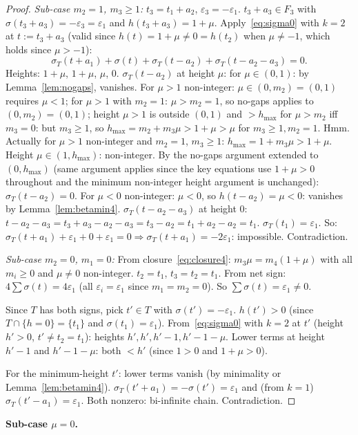 \documentclass{article}
\begin{document}
\begin{proof}
\textit{Sub-case $m_2=1$, $m_3\ge 1$:}
$t_3=t_1+a_2$, $\varepsilon_3=-\varepsilon_1$.  $t_3+a_3\in F_3$ with
$\sigma(t_3+a_3)=-\varepsilon_3=\varepsilon_1$ and $h(t_3+a_3)=1+\mu$.
Apply~\eqref{eq:sigma0} with $k=2$ at $t:=t_3+a_3$ (valid since $h(t)=1+\mu\ne 0=h(t_2)$
when $\mu\ne -1$, which holds since $\mu>-1$):
\[
  \sigma_T(t+a_1)+\sigma(t)+\sigma_T(t-a_2)+\sigma_T(t-a_2-a_3)=0.
\]
Heights: $1+\mu$, $1+\mu$, $\mu$, $0$.
$\sigma_T(t-a_2)$ at height $\mu$:
for $\mu\in(0,1)$: by Lemma~\ref{lem:nogaps}, vanishes.
For $\mu>1$ non-integer: $\mu\in(0,m_2)=(0,1)$ requires $\mu<1$; for $\mu>1$ with $m_2=1$: $\mu>m_2=1$, so no-gaps applies to $(0,m_2)=(0,1)$; height $\mu>1$ is outside $(0,1)$ and $>h_{\max}$ for $\mu>m_2$ iff $m_3=0$: but $m_3\ge 1$, so $h_{\max}=m_2+m_3\mu>1+\mu>\mu$ for $m_3\ge 1, m_2=1$. Hmm.
Actually for $\mu>1$ non-integer and $m_2=1$, $m_3\ge 1$: $h_{\max}=1+m_3\mu>1+\mu$.
Height $\mu\in(1,h_{\max})$: non-integer. By the no-gaps argument extended to $(0,h_{\max})$ (same argument applies since the key equations use $1+\mu>0$ throughout and the minimum non-integer height argument is unchanged): $\sigma_T(t-a_2)=0$.
For $\mu<0$ non-integer: $\mu<0$, so $h(t-a_2)=\mu<0$: vanishes by Lemma~\ref{lem:betamin4}.
$\sigma_T(t-a_2-a_3)$ at height $0$: $t-a_2-a_3=t_3+a_3-a_2-a_3=t_3-a_2=t_1+a_2-a_2=t_1$.
$\sigma_T(t_1)=\varepsilon_1$.
So: $\sigma_T(t+a_1)+\varepsilon_1+0+\varepsilon_1=0 \Rightarrow \sigma_T(t+a_1)=-2\varepsilon_1$: impossible. Contradiction.

\textit{Sub-case $m_2=0$, $m_1=0$:}
From closure~\eqref{eq:closure4}: $m_3\mu=m_4(1+\mu)$ with all $m_i\ge 0$ and $\mu\ne 0$ non-integer.
$t_2=t_1$, $t_3=t_2=t_1$. From net sign: $4\sum\sigma(t)=4\varepsilon_1$ (all $\varepsilon_i=\varepsilon_1$ since $m_1=m_2=0$).
So $\sum\sigma(t)=\varepsilon_1\ne 0$.

Since $T$ has both signs, pick $t'\in T$ with $\sigma(t')=-\varepsilon_1$.
$h(t')>0$ (since $T\cap\{h=0\}=\{t_1\}$ and $\sigma(t_1)=\varepsilon_1$).
From~\eqref{eq:sigma0} with $k=2$ at $t'$ (height $h'>0$, $t'\ne t_2=t_1$):
heights $h',h',h'-1,h'-1-\mu$.  Lower terms at height $h'-1$ and $h'-1-\mu$:
both $<h'$ (since $1>0$ and $1+\mu>0$).

For the minimum-height $t'$: lower terms vanish (by minimality or Lemma~\ref{lem:betamin4}).
$\sigma_T(t'+a_1)=-\sigma(t')=\varepsilon_1$ and (from $k=1$) $\sigma_T(t'-a_1)=\varepsilon_1$.
Both nonzero: bi-infinite chain. Contradiction.
\end{proof}

\medskip
\noindent\textbf{Sub-case $\mu=0$.}
\end{document}

